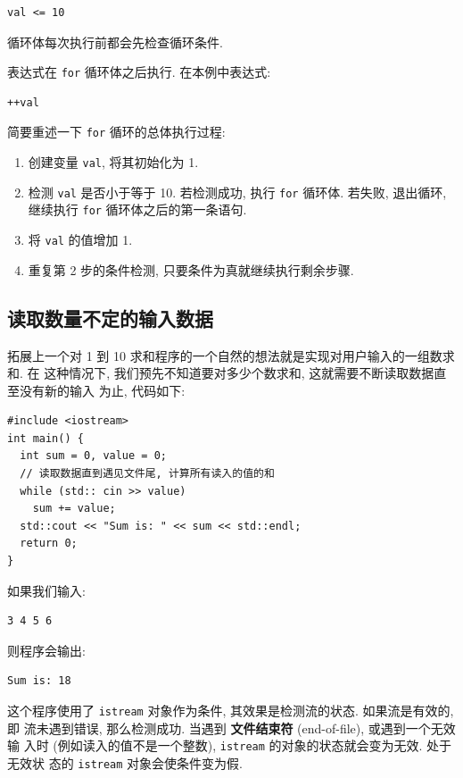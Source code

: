 \documentclass[lang=cn]{elegantbook}
\begin{document}
\begin{verbatim}
val <= 10
\end{verbatim}

循环体每次执行前都会先检查循环条件.

表达式在 \texttt{for} 循环体之后执行. 在本例中表达式:

\begin{verbatim}
++val
\end{verbatim}

简要重述一下 \texttt{for} 循环的总体执行过程:

\begin{enumerate}
\item 创建变量 \texttt{val}, 将其初始化为 1.
\item 检测 \texttt{val} 是否小于等于 10. 若检测成功, 执行 \texttt{for} 循环体. 若失败, 退出循环,
继续执行 \texttt{for} 循环体之后的第一条语句.
\item 将 \texttt{val} 的值增加 1.
\item 重复第 2 步的条件检测, 只要条件为真就继续执行剩余步骤.
\end{enumerate}

\subsection{读取数量不定的输入数据}
\label{sec:orgaa4ce68}

拓展上一个对 1 到 10 求和程序的一个自然的想法就是实现对用户输入的一组数求和. 在
这种情况下, 我们预先不知道要对多少个数求和, 这就需要不断读取数据直至没有新的输入
为止, 代码如下:

\begin{verbatim}
#include <iostream>
int main() {
  int sum = 0, value = 0;
  // 读取数据直到遇见文件尾, 计算所有读入的值的和
  while (std:: cin >> value)
    sum += value;
  std::cout << "Sum is: " << sum << std::endl;
  return 0;
}
\end{verbatim}

如果我们输入:

\begin{verbatim}
3 4 5 6
\end{verbatim}

则程序会输出:

\begin{verbatim}
Sum is: 18
\end{verbatim}
这个程序使用了 \texttt{istream} 对象作为条件, 其效果是检测流的状态. 如果流是有效的, 即
流未遇到错误, 那么检测成功. 当遇到 \textbf{文件结束符} (end-of-file), 或遇到一个无效输
入时 (例如读入的值不是一个整数), \texttt{istream} 的对象的状态就会变为无效. 处于无效状
态的 \texttt{istream} 对象会使条件变为假.
\end{document}
